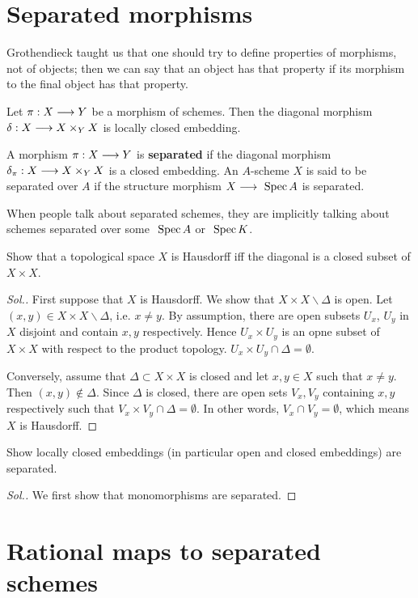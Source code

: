 \documentclass[11pt]{book} %
\begin{document}
\section{Separated morphisms}
Grothendieck taught us that one should try to define properties of morphisms, not of objects; then we can say that an object has that property if its morphism to the final object has that property.
\begin{proposition}
Let $\pi:X\longrightarrow Y$ be a morphism of schemes. Then the diagonal morphism $\delta:X\longrightarrow X\times_Y X$ is locally closed embedding.
\end{proposition}
\begin{definition}
A morphism $\pi:X\longrightarrow Y$ is \textbf{separated} if the diagonal morphism $\delta_\pi:X\longrightarrow X\times_Y X$ is a closed embedding. An $A$-scheme $X$ is said to be separated over $A$ if the structure morphism $X\longrightarrow \text{ Spec\,} A$ is separated.
\end{definition}
When people talk about separated schemes, they are implicitly talking about schemes separated over some $\text{ Spec\,} A$ or $\text{ Spec\,} K$.
\begin{exr}
Show that a topological space $X$ is Hausdorff iff the diagonal is a closed subset of $X\times X$. 
\end{exr}
\begin{proof}[Sol.]
First suppose that $X$ is Hausdorff. We show that $X\times X\backslash \Delta$ is open. Let $(x,y)\in  X\times X\backslash \Delta$, i.e. $x\neq y$. By assumption, there are open subsets $U_x$, $U_y$ in $X$ disjoint and contain $x,y$ respectively. Hence $U_x\times U_y$ is an opne subset of $X\times X$ with respect to the product topology. $U_x\times U_y \cap \Delta=\emptyset$.

Conversely, assume that $\Delta\subset X\times X$ is closed and let $x,y\in X$ such that $x\neq y$. Then $(x,y)\notin \Delta$. Since $\Delta$ is closed, there are open sets $V_x, V_y$ containing $x,y$ respectively such that $V_x\times V_y\cap \Delta=\emptyset$. In other words, $V_x\cap V_y=\emptyset$, which means $X$ is Hausdorff.
\end{proof}
\begin{exr}
Show locally closed embeddings (in particular open and closed embeddings) are separated. 
\end{exr}
\begin{proof}[Sol.]
We first show that monomorphisms are separated.
\end{proof}
\section{Rational maps to separated schemes}
\end{document}
